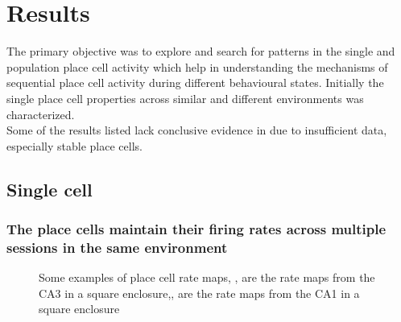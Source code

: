 \chapter{Results}
\label{results}

The primary objective was to explore and search for patterns in the single and population place cell activity which help in understanding the mechanisms of sequential place cell activity during different behavioural states. Initially the single place cell properties across similar and different environments was characterized.  \\
Some of the results listed lack conclusive evidence in due to insufficient data, especially stable place cells. 

\section{Single cell}
\subsection[Place cell firing in same environment]{The place cells maintain their firing rates across multiple sessions in the same environment}


\begin{figure}[htb!]
\centering
{}
\label{fig:ratemaps}
\caption[Rate maps]{Some examples of place cell rate maps, ,  are the rate maps from the CA3 in a square enclosure,,  are the rate maps from the CA1 in a square enclosure}
\end{figure}


